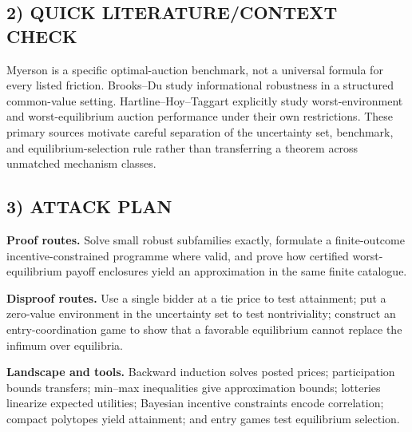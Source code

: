 \documentclass[11pt,a4paper]{article}
\theoremstyle{definition}
\begin{document}
\subsection*{2) QUICK LITERATURE/CONTEXT CHECK}
Myerson \cite{Myerson} is a specific optimal-auction benchmark, not a universal formula for every listed friction. Brooks--Du \cite{BrooksDu} study informational robustness in a structured common-value setting. Hartline--Hoy--Taggart \cite{HHT} explicitly study worst-environment and worst-equilibrium auction performance under their own restrictions. These primary sources motivate careful separation of the uncertainty set, benchmark, and equilibrium-selection rule rather than transferring a theorem across unmatched mechanism classes.

\subsection*{3) ATTACK PLAN}
\textbf{Proof routes.} Solve small robust subfamilies exactly, formulate a finite-outcome incentive-constrained programme where valid, and prove how certified worst-equilibrium payoff enclosures yield an approximation in the same finite catalogue.

\textbf{Disproof routes.} Use a single bidder at a tie price to test attainment; put a zero-value environment in the uncertainty set to test nontriviality; construct an entry-coordination game to show that a favorable equilibrium cannot replace the infimum over equilibria.

\textbf{Landscape and tools.} Backward induction solves posted prices; participation bounds transfers; min--max inequalities give approximation bounds; lotteries linearize expected utilities; Bayesian incentive constraints encode correlation; compact polytopes yield attainment; and entry games test equilibrium selection.
\end{document}

